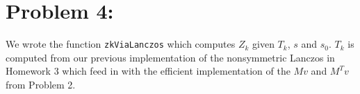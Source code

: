 \section*{Problem 4:}
We wrote the function \texttt{zkViaLanczos} which computes $Z_k$	given $T_{k}$, $s$ and $s_{0}$. $T_{k}$ is computed from our previous implementation of the nonsymmetric Lanczos in Homework 3 which feed in with the efficient implementation of the $Mv$ and $M^{T}v$ from Problem 2. 
